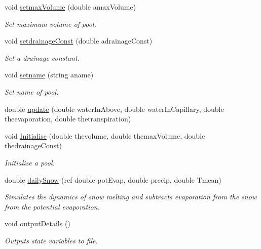\begin{DoxyCompactItemize}
void \mbox{\hyperlink{classsimplesoil_model_1_1pool_a4afb35706d081f816ac7e0ee97a56018}{setmax\+Volume}} (double amax\+Volume)
\begin{DoxyCompactList}\small\item\em Set maximum volume of pool. \end{DoxyCompactList}\item 
void \mbox{\hyperlink{classsimplesoil_model_1_1pool_abcfebe450f6322fd8ece80e88026eb3b}{setdrainage\+Const}} (double adrainage\+Const)
\begin{DoxyCompactList}\small\item\em Set a drainage constant. \end{DoxyCompactList}\item 
void \mbox{\hyperlink{classsimplesoil_model_1_1pool_a52016de02c5aa32f2fb6927252619494}{setname}} (string aname)
\begin{DoxyCompactList}\small\item\em Set name of pool. \end{DoxyCompactList}\item 
double \mbox{\hyperlink{classsimplesoil_model_1_1pool_a5b7b5a3ce11f8db111e79c4726552001}{update}} (double water\+In\+Above, double water\+In\+Capillary, double theevaporation, double thetranspiration)
\item 
void \mbox{\hyperlink{classsimplesoil_model_1_1pool_a926062b473c9a2aa0ffb63cc375afbed}{Initialise}} (double thevolume, double themax\+Volume, double thedrainage\+Const)
\begin{DoxyCompactList}\small\item\em Initialise a pool. \end{DoxyCompactList}\item 
double \mbox{\hyperlink{classsimplesoil_model_1_1pool_aaa4af3081e7de0130231425871a51a85}{daily\+Snow}} (ref double pot\+Evap, double precip, double Tmean)
\begin{DoxyCompactList}\small\item\em Simulates the dynamics of snow melting and subtracts evaporation from the snow from the potential evaporation. \end{DoxyCompactList}\item 
\mbox{\label{classsimplesoil_model_1_1pool_a9757328038ba614ff98df009e7c2c7f5}} 
void \mbox{\hyperlink{classsimplesoil_model_1_1pool_a9757328038ba614ff98df009e7c2c7f5}{output\+Details}} ()
\begin{DoxyCompactList}\small\item\em Outputs state variables to file. \end{DoxyCompactList}\item 

\end{DoxyCompactItemize}
